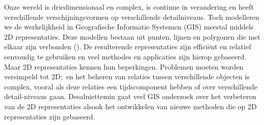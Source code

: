 {

Onze wereld is driedimensionaal en complex, is continue in verandering en heeft verschillende verschijningsvormen op verschillende detailniveaus.
Toch modelleren we de werkelijkheid in Geografische Informatie Systemen (GIS) meestal middels 2D representaties.
Deze modellen bestaan uit punten, lijnen en polygonen die met elkaar zijn verbonden ().
De resulterende representaties zijn efficiënt en relatief eenvoudig te gebruiken en veel methodes en applicaties zijn hierop gebaseerd.
Maar 2D representaties kennen hun beperkingen.
Problemen moeten worden versimpeld tot 2D;\ en het beheren van relaties tussen verschillende objecten is complex, vooral als deze relaties een tijdscomponent hebben of over verschillende detail-niveaus gaan.
Desalniettemin gaat veel GIS onderzoek over het verbeteren van de 2D representaties alsook het ontwikkelen van nieuwe methoden die op 2D representaties zijn gebaseerd.

}
